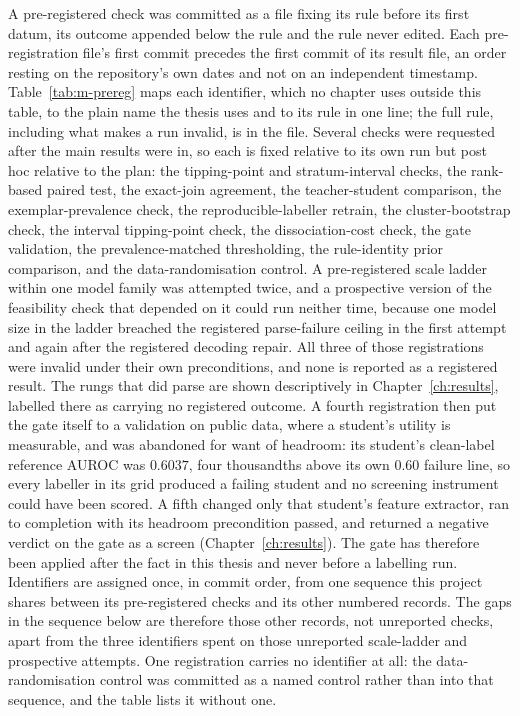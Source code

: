 A pre-registered check was committed as a file fixing its rule before its first datum, its
outcome appended below the rule and the rule never edited. Each pre-registration file's first commit precedes the first commit of its result file, an
order resting on the repository's own dates and not on an independent timestamp. Table~\ref{tab:m-prereg} maps each identifier, which no chapter uses outside this table, to
the plain name the thesis uses and to its rule in one line; the full rule, including what
makes a run invalid, is in the file. Several checks were requested after the main results
were in, so each is fixed relative to its own run but post hoc relative to the plan: the tipping-point and stratum-interval checks, the
rank-based paired test, the exact-join agreement, the teacher-student comparison,
the exemplar-prevalence check, the reproducible-labeller retrain, the
cluster-bootstrap check, the interval tipping-point check, the dissociation-cost check, the gate
validation, the prevalence-matched thresholding, the rule-identity prior comparison, and the
data-randomisation control.
A pre-registered scale
ladder within one model family was attempted twice, and a prospective version of the
feasibility check that depended on it could run neither time, because one model size in the
ladder breached the registered parse-failure ceiling in the first attempt and again after
the registered decoding repair. All three of those registrations were invalid under their
own preconditions, and none is reported as a registered result. The rungs that did parse are
shown descriptively in Chapter~\ref{ch:results}, labelled there as carrying no registered
outcome. A fourth registration then put the gate itself to a validation on public data, where a
student's utility is measurable, and was abandoned for want of headroom: its student's
clean-label reference AUROC was $0.6037$, four thousandths above its own $0.60$ failure
line, so every labeller in its grid produced a failing student and no screening instrument
could have been scored. A fifth changed only that student's feature extractor, ran to
completion with its headroom precondition passed, and returned a negative verdict on the
gate as a screen (Chapter~\ref{ch:results}). The gate has therefore been applied after the fact in this
thesis and never before a labelling run. Identifiers are assigned once, in commit order, from one sequence this project shares between its
pre-registered checks and its other numbered records. The gaps in the
sequence below are therefore those other records, not unreported checks, apart from the three
identifiers spent on those unreported scale-ladder and prospective attempts. One registration
carries no identifier at all: the data-randomisation control was committed as a named control
rather than into that sequence, and the table lists it without one.

